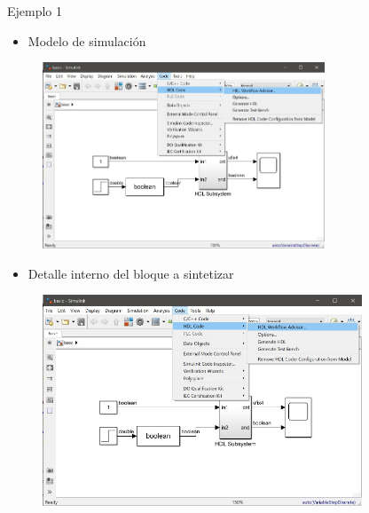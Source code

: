 \documentclass{beamer}
\begin{document}
\begin{frame}{Ejemplo 1}
\begin{itemize}
	\item Modelo de simulación
\end{itemize}
\begin{figure}
	\includegraphics[page=4, width=0.75\textwidth]{figs/figs.pdf}%
\end{figure}
\begin{itemize}
	\item Detalle interno del bloque a sintetizar
\end{itemize}
\begin{figure}
	\includegraphics[page=5, width=0.85\textwidth]{figs/figs.pdf}%
\end{figure}
\end{frame}
\end{document}
